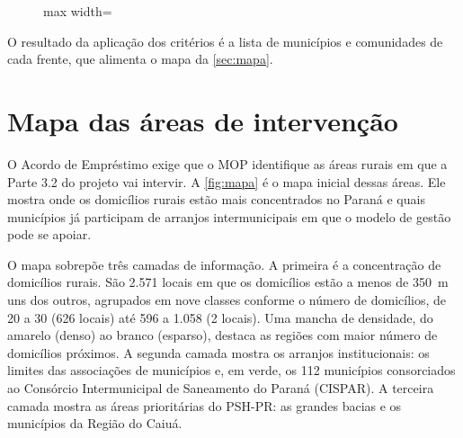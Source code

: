 \begin{figure}[H]
\begin{adjustbox}{max width=\linewidth}
  \end{adjustbox}
\end{figure}

O resultado da aplicação dos critérios é a lista de municípios e comunidades de
cada frente, que alimenta o mapa da \autoref{sec:mapa}.


\FloatBarrier
\section{Mapa das áreas de intervenção}
\label{sec:mapa}

O Acordo de Empréstimo exige que o MOP identifique as áreas rurais em que a
Parte 3.2 do projeto vai intervir. A \autoref{fig:mapa} é o mapa inicial
dessas áreas. Ele mostra onde os domicílios rurais estão mais concentrados no
Paraná e quais municípios já participam de arranjos intermunicipais em que o
modelo de gestão pode se apoiar.

O mapa sobrepõe três camadas de informação. A primeira é a concentração de
domicílios rurais. São 2.571 locais em que os domicílios estão a menos de
350~m uns dos outros, agrupados em nove classes conforme o número de
domicílios, de 20 a 30 (626 locais) até 596 a 1.058 (2 locais). Uma mancha de
densidade, do amarelo (denso) ao branco (esparso), destaca as regiões com
maior número de domicílios próximos. A segunda camada mostra os arranjos
institucionais: os limites das associações de municípios e, em verde, os 112
municípios consorciados ao Consórcio Intermunicipal de Saneamento do Paraná
(CISPAR). A terceira camada mostra as áreas prioritárias do PSH-PR: as grandes
bacias e os municípios da Região do Caiuá.

